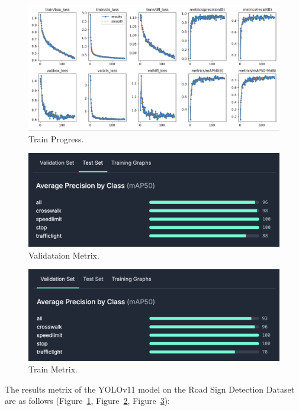 \documentclass[letterpaper, 10 pt, conference]{ieeeconf}
\begin{document}
\begin{figure}[!t]
    \centering
    \includegraphics[width=0.9\linewidth]{figures/result.jpg} 
    \caption{Train Progress.}
    \label{fig:train_progress}
\end{figure}

\begin{figure}[!t]
    \centering
    \includegraphics[width=0.9\linewidth]{figures/green1.png} 
    \caption{Validataion Metrix.}
    \label{fig:val_metrix}
\end{figure}

\begin{figure}[!t]
    \centering
    \includegraphics[width=0.9\linewidth]{figures/green2.png} 
    \caption{Train Metrix.}
    \label{fig:train_metrix}
\end{figure}

The results metrix of the YOLOv11 model on the Road Sign Detection Dataset are as follows (Figure~\ref{fig:train_progress}, Figure~\ref{fig:val_metrix}, Figure~\ref{fig:train_metrix}):
\end{document}
